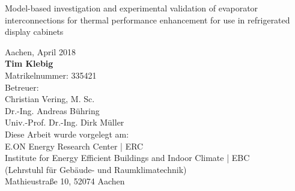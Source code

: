 \begin{titlepage}
\begin{addmargin}[\marginCoverPage]{0cm}
\addvspace{1.5cm}
\begin{center}
{\selectfont Model-based investigation and experimental validation of evaporator interconnections for thermal performance enhancement for use in refrigerated display cabinets}
\end{center}

\vfill
\begin{center}
\begingroup
{}\selectfont
Aachen, April 2018 \\
\addvspace{0.5cm}
\textbf{Tim Klebig} \\
Matrikelnummer: 335421 \\
\addvspace{0.5cm}
Betreuer:\\
Christian Vering, M. Sc. \\
Dr.-Ing. Andreas Bühring \\
Univ.-Prof. Dr.-Ing. Dirk Müller \\
\addvspace{0.5cm}
Diese Arbeit wurde vorgelegt am:\\
E.ON Energy Research Center | ERC \\
Institute for Energy Efficient Buildings and Indoor Climate | EBC\\
(Lehrstuhl für Gebäude- und Raumklimatechnik)\\
Mathieustraße 10, 52074 Aachen\\
\endgroup
\end{center}
\end{addmargin}
\end{titlepage}

